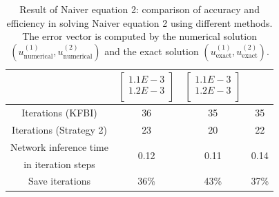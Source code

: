 \documentclass{article}
\begin{document}
\begin{table}[ht]
\begin{tabular}{|c|c|c|c|}
         &  $\begin{bmatrix}  1.1E-3\\ 1.2E-3\\ \end{bmatrix}$
         &  $\begin{bmatrix}  1.1E-3\\ 1.2E-3\\ \end{bmatrix}$ \\ \hline
         Iterations (KFBI) & 36 & 35 & 35 \\ \hline 
         Iterations (Strategy 2) & 23 & 20 & 22   \\ \hline 
         
         Network inference time
         & \multirow{2}{*}{0.12\bigstrut}
         & \multirow{2}{*}{0.11\bigstrut}
         & \multirow{2}{*}{0.14\bigstrut} \\
         in iteration steps & & & \\ \hline
         
         Save iterations & 36\% & 43\% & 37\% \\ \hline
    \end{tabular}
    \caption{Result of Naiver equation 2: comparison of accuracy and efficiency in solving Naiver equation 2 using different methods. The error vector is computed by the numerical solution $(u_{\mbox{numerical}}^{(1)}, u_{\mbox{numerical}}^{(2)})$ and the exact solution $(u_{\mbox{exact}}^{(1)}, u_{\mbox{exact}}^{(2)})$.}
    \label{label_new_Naiver}
\end{table}
    
\end{document}
